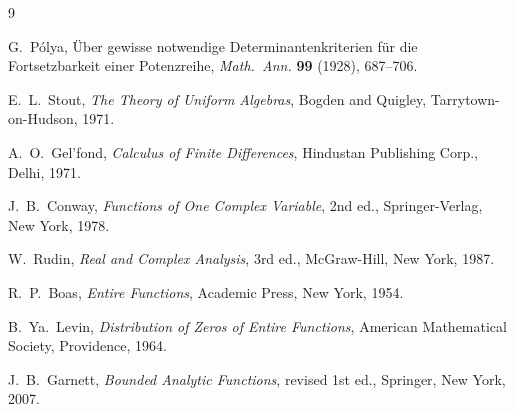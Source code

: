 \documentclass[12pt]{amsart}
\theoremstyle{definition}
\begin{document}
\begin{thebibliography}{9}

G.~Pólya,
Über gewisse notwendige Determinantenkriterien für die Fortsetzbarkeit
einer Potenzreihe,
\textit{Math.\ Ann.} \textbf{99} (1928), 687--706.

E.~L.~Stout,
\textit{The Theory of Uniform Algebras},
Bogden and Quigley, Tarrytown-on-Hudson, 1971.

A.~O.~Gel'fond,
\textit{Calculus of Finite Differences},
Hindustan Publishing Corp., Delhi, 1971.

J.~B.~Conway,
\textit{Functions of One Complex Variable}, 2nd ed.,
Springer-Verlag, New York, 1978.

W.~Rudin,
\textit{Real and Complex Analysis}, 3rd ed.,
McGraw-Hill, New York, 1987.

R.~P.~Boas,
\textit{Entire Functions},
Academic Press, New York, 1954.

B.~Ya.~Levin,
\textit{Distribution of Zeros of Entire Functions},
American Mathematical Society, Providence, 1964.

J.~B.~Garnett,
\textit{Bounded Analytic Functions}, revised 1st ed.,
Springer, New York, 2007.

\end{thebibliography}
\end{document}
